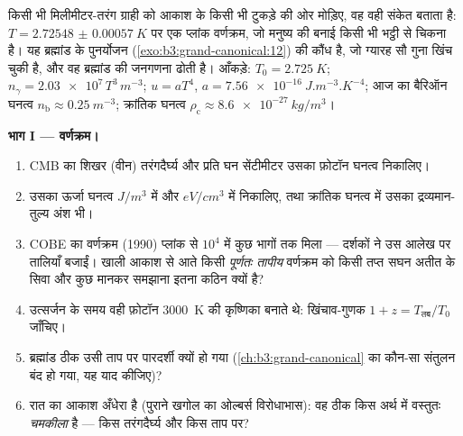 \begin{problem}\label{pb:b3:photons-phonons:1}
किसी भी मिलीमीटर-तरंग ग्राही को आकाश के किसी भी टुकड़े की ओर
मोड़िए, वह वही संकेत बताता है: $T =
\qty{2.72548(57)}{K}$ पर एक प्लांक वर्णक्रम, जो मनुष्य की बनाई किसी
भी भट्ठी से चिकना है। यह ब्रह्मांड के पुनर्योजन
(\cref{exo:b3:grand-canonical:12}) की कौंध है, जो ग्यारह सौ गुना
खिंच चुकी है, और वह ब्रह्मांड की जनगणना ढोती है। आँकड़े: $T_0 =
\qty{2.725}{K}$; $n_\gamma = \num{2.03e7}\,T^3\,\unit{m^{-3}}$;
$u = aT^4$, $a = \qty{7.56e-16}{J.m^{-3}.K^{-4}}$; आज का बैरिऑन
घनत्व $n_{\text{b}} \approx \qty{0.25}{m^{-3}}$; क्रांतिक घनत्व
$\rho_{\text{c}} \approx \qty{8.6e-27}{kg/m^3}$।

\medskip\noindent\textbf{भाग I --- वर्णक्रम।}
\begin{enumerate}
  \item CMB का शिखर (वीन) तरंगदैर्घ्य और प्रति घन सेंटीमीटर उसका
        फ़ोटॉन घनत्व निकालिए।
  \item उसका ऊर्जा घनत्व $\unit{J/m^3}$ में और
        $\unit{eV/cm^3}$ में निकालिए, तथा क्रांतिक घनत्व में उसका
        द्रव्यमान-तुल्य अंश भी।
  \item COBE का वर्णक्रम (1990) प्लांक से
        $10^4$ में कुछ भागों तक मिला --- दर्शकों ने उस आलेख पर
        तालियाँ बजाईं। खाली आकाश से आते किसी \emph{पूर्णतः तापीय}
        वर्णक्रम को किसी तप्त सघन अतीत के सिवा और कुछ मानकर समझाना
        इतना कठिन क्यों है?
  \item उत्सर्जन के समय वही फ़ोटॉन \qty{3000}{K} की कृष्णिका बनाते
        थे: खिंचाव-गुणक $1 + z =
        T_{\text{तब}}/T_0$ जाँचिए।
  \item ब्रह्मांड ठीक उसी ताप पर पारदर्शी क्यों हो गया
        (\cref{ch:b3:grand-canonical} का कौन-सा संतुलन बंद हो गया,
        यह याद कीजिए)?
  \item रात का आकाश अँधेरा है (पुराने खगोल का ओल्बर्स विरोधाभास):
        वह ठीक किस अर्थ में वस्तुतः \emph{चमकीला} है --- किस
        तरंगदैर्घ्य और किस ताप पर?
\end{enumerate}


\end{problem}
